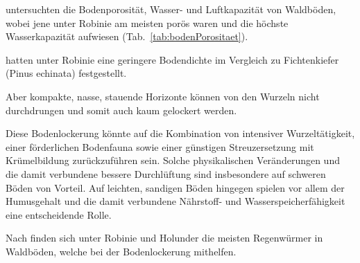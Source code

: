 \documentclass[twocolumn]{scrartcl}
\begin{document}
\citet{nemec1925waldboden} untersuchten die Bodenporosität, Wasser- und Luftkapazität von Waldböden, wobei jene unter Robinie am meisten porös waren und die höchste Wasserkapazität aufwiesen (Tab.~\ref{tab:bodenPorositaet}).

\begin{table}[htbp]
  \centering
  \label{tab:bodenPorositaet}
\end{table}

\citet{ashby1986robinieWuchssteigerung} hatten unter Robinie eine geringere Bodendichte im Vergleich zu Fichtenkiefer (Pinus echinata) festgestellt.

Aber kompakte, nasse, stauende Horizonte können von den Wurzeln nicht durchdrungen \citep{auten1933robineStandort,mueller1991robinie} und somit auch kaum gelockert werden.

Diese Bodenlockerung könnte auf die Kombination von intensiver Wurzeltätigkeit, einer förderlichen Bodenfauna sowie einer günstigen Streuzersetzung mit Krümelbildung zurückzuführen sein. Solche physikalischen Veränderungen und die damit verbundene bessere Durchlüftung sind insbesondere auf schweren Böden von Vorteil. Auf leichten, sandigen Böden hingegen spielen vor allem der Humusgehalt und die damit verbundene Nährstoff- und Wasserspeicherfähigkeit eine entscheidende Rolle.

Nach \citet{bluemke1955robinie} finden sich unter Robinie und Holunder die meisten Regenwürmer in Waldböden, welche bei der Bodenlockerung mithelfen.
\end{document}
